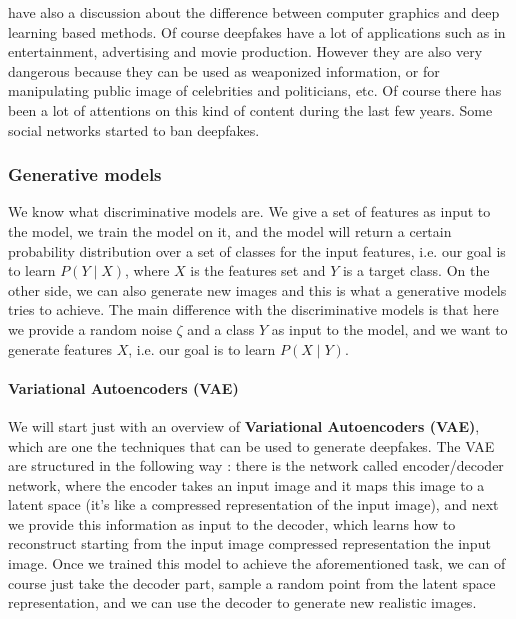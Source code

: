 \documentclass[11pt]{article}
\begin{document}
have also a discussion about the difference between computer graphics and deep learning based methods. Of course deepfakes have a lot of applications such as in entertainment, advertising and movie production. However they are also very dangerous because they can be used as weaponized information, or for manipulating public image of celebrities and politicians, etc. Of course there has been a lot of attentions on this kind of content during the last few years. Some social networks started to ban deepfakes.

\subsubsection{Generative models}
We know what discriminative models are. We give a set of features as input to the model, we train the model on it, and the model will return a certain probability distribution over a set of classes for the input features, i.e. our goal is to learn $P(Y \mid X)$, where $X$ is the features set and $Y$ is a target class. On the other side, we can also generate new images and this is what a generative models tries to achieve. The main difference with the discriminative models is that here we provide a random noise $\zeta$ and a class $Y$ as input to the model, and we want to generate features $X$, i.e. our goal is to learn $P(X \mid Y)$. 

\paragraph{Variational Autoencoders (VAE)} We will start just with an overview of \textbf{Variational Autoencoders (VAE)}, which are one the techniques that can be used to generate deepfakes. The VAE are structured in the following way : there is the network called encoder/decoder network, where the encoder takes an input image and it maps this image to a latent space (it's like a compressed representation of the input image), and next we provide this information as input to the decoder, which learns how to reconstruct starting from the input image compressed representation the input image. Once we trained this model to achieve the aforementioned task, we can of course just take the decoder part, sample a random point from the latent space representation, and we can use the decoder to generate new realistic images. 
\end{document}
